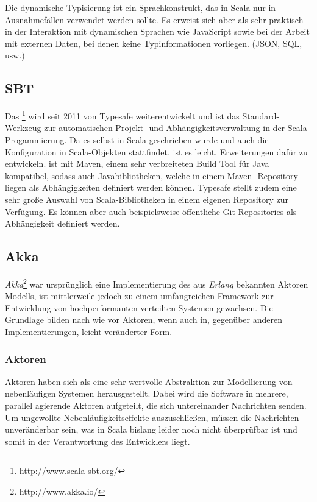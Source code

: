 Die dynamische Typisierung ist ein Sprachkonstrukt, das in Scala nur in Ausnahmefällen verwendet
werden sollte. Es erweist sich aber als sehr praktisch in der Interaktion mit dynamischen Sprachen
wie JavaScript sowie bei der Arbeit mit externen Daten, bei denen keine Typinformationen vorliegen.
(JSON, SQL, usw.)

\subsection{SBT}
\label{sec:sbt}

Das \footnote{http://www.scala-sbt.org/} wird seit 2011 von Typesafe weiterentwickelt und
ist das Standard-Werkzeug zur automatischen Projekt- und Abhängigkeitsverwaltung in der Scala-
Progammierung. Da es selbst in Scala geschrieben wurde und auch die Konfiguration in Scala-Objekten
stattfindet, ist es leicht, Erweiterungen dafür zu entwickeln.  ist mit Maven, einem sehr
verbreiteten Build Tool für Java kompatibel, sodass auch Javabibliotheken, welche in einem Maven-
Repository liegen als Abhängigkeiten definiert werden können. Typesafe stellt zudem eine sehr große
Auswahl von Scala-Bibliotheken in einem eigenen Repository zur Verfügung. Es können aber auch
beispielsweise öffentliche Git-Repositories als Abhängigkeit definiert werden.

\subsection{Akka}
\label{sec:akka}

\textit{Akka}\footnote{http://www.akka.io/} war ursprünglich eine Implementierung des aus
\textit{Erlang} bekannten Aktoren Modells, ist mittlerweile jedoch zu einem umfangreichen Framework
zur Entwicklung von hochperformanten verteilten Systemen gewachsen. Die Grundlage bilden nach wie
vor Aktoren, wenn auch in, gegenüber anderen Implementierungen, leicht veränderter Form.
\cite{actors}

\subsubsection{Aktoren}

Aktoren haben sich als eine sehr wertvolle Abstraktion zur Modellierung von nebenläufigen Systemen
herausgestellt. Dabei wird die Software in mehrere, parallel agierende Aktoren aufgeteilt, die
sich untereinander Nachrichten senden. Um ungewollte Nebenläufigkeitseffekte auszuschließen, müssen
die Nachrichten unveränderbar sein, was in Scala bislang leider noch nicht überprüfbar ist und somit
in der Verantwortung des Entwicklers liegt.

